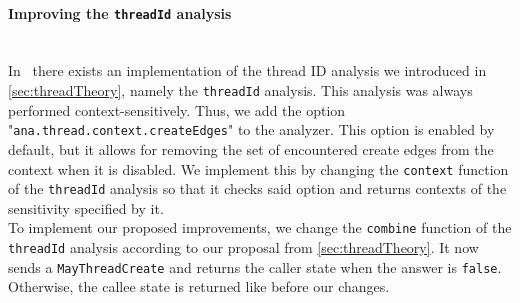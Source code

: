     \paragraph{Improving the \texttt{threadId} analysis}\mbox{}\\
    In \gob\ there exists an implementation of the thread ID analysis we introduced in \autoref{sec:threadTheory}, namely the \texttt{threadId} analysis. This analysis was always performed context-sensitively. Thus, we add the option "\texttt{ana.thread.context.createEdges}" to the analyzer. This option is enabled by default, but it allows for removing the set of encountered create edges from the context when it is disabled. We implement this by changing the \texttt{context} function of the \texttt{threadId} analysis so that it checks said option and returns contexts of the sensitivity specified by it.\\
    To implement our proposed improvements, we change the \texttt{combine} function of the \texttt{threadId} analysis according to our proposal from \autoref{sec:threadTheory}. It now sends a \texttt{MayThreadCreate} and returns the caller state when the answer is \texttt{false}. Otherwise, the callee state is returned like before our changes.

